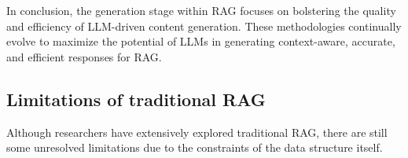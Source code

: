 \documentclass[lettersize,journal]{IEEEtran}
\begin{document}

In conclusion, the generation stage within RAG focuses on bolstering the quality and efficiency of LLM-driven content generation. These methodologies continually evolve to maximize the potential of LLMs in generating context-aware, accurate, and efficient responses for RAG.



\subsection{Limitations of traditional RAG}
Although researchers have extensively explored traditional RAG, there are still some unresolved limitations due to the constraints of the data structure itself.
\end{document}
